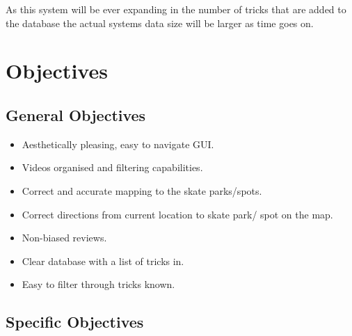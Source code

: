 As this system will be ever expanding in the number of tricks that are added to the database the actual systems data size will be larger as time goes on.

\section{Objectives}

\subsection{General Objectives}

\begin{itemize}
\item Aesthetically pleasing, easy to navigate GUI.
\item Videos organised and filtering capabilities.
\item Correct and accurate mapping to the skate parks/spots.
\item Correct directions from current location to skate park/ spot on the map.
\item Non-biased reviews.
\item Clear database with a list of tricks in.
\item Easy to filter through tricks known.
\end{itemize}

\subsection{Specific Objectives}


